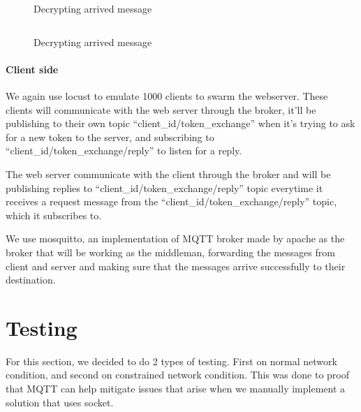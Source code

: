\begin{figure}[h]
\inputminted[firstline=13, lastline=14]{kotlin}{code/mqtt-main.kt}
\inputminted[firstline=38, lastline=41]{kotlin}{code/mqtt-main.kt}
\caption{Decrypting arrived message}
\label{fig:mqtt-decrypt}
\end{figure}

\begin{figure}[h]
\inputminted[firstline=46, lastline=62]{kotlin}{code/mqtt-main.kt}
\caption{Decrypting arrived message}
\label{fig:mqtt-decrypt}
\end{figure}

\paragraph{Client side}
We again use locust to emulate 1000 clients to swarm the webserver. These clients will communicate with the web server through the broker, it'll be publishing to their own topic ``client\_id/token\_exchange'' when it's trying to ask for a new token to the server, and subscribing to  ``client\_id/token\_exchange/reply'' to listen for a reply.


The web server communicate with the client through the broker and will be publishing replies to ``client\_id/token\_exchange/reply'' topic everytime it receives a request message from the ``client\_id/token\_exchange/reply'' topic, which it subscribes to.


We use mosquitto, an implementation of MQTT broker made by apache as the broker that will be working as the middleman, forwarding the messages from client and server and making sure that the messages arrive successfully to their destination.


\section{Testing}

For this section, we decided to do 2 types of testing. First on normal network condition, and second on constrained network condition. This was done to proof that MQTT can help mitigate issues that arise when we manually implement a solution that uses socket. 

